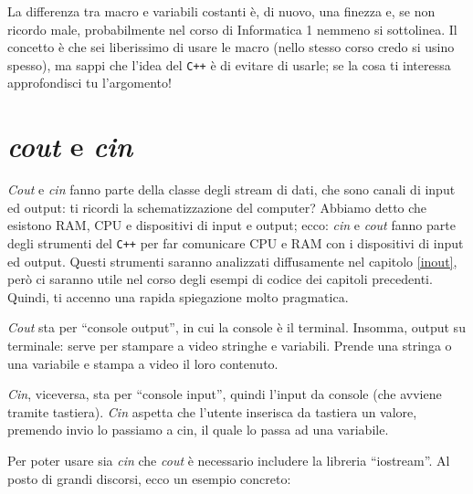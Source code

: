 	La differenza tra macro e variabili costanti è, di nuovo, una finezza e, se non ricordo male, probabilmente nel corso di Informatica 1 nemmeno si sottolinea. Il concetto è che sei liberissimo di usare le macro (nello stesso corso credo si usino spesso), ma sappi che l'idea del \verb|C++| è di evitare di usarle; se la cosa ti interessa approfondisci tu l'argomento!
	
	\section{\emph{cout} e \emph{cin}}\label{coutcin}
	\emph{Cout} e \emph{cin} fanno parte della classe degli stream di dati, che sono canali di input ed output: ti ricordi la schematizzazione del computer? Abbiamo detto che esistono RAM, CPU e dispositivi di input e output; ecco: \emph{cin} e \emph{cout} fanno parte degli strumenti del \verb|C++| per far comunicare CPU e RAM con i dispositivi di input ed output. Questi strumenti saranno analizzati diffusamente nel capitolo \ref{inout}, però ci saranno utile nel corso degli esempi di codice dei capitoli precedenti. Quindi, ti accenno una rapida spiegazione molto pragmatica.
	
	
	\emph{Cout} sta per ``console output'',  in cui la console è il terminal. Insomma, output su terminale: serve per stampare a video stringhe e variabili. Prende una stringa o una variabile e stampa a video il loro contenuto.
	
	\emph{Cin}, viceversa, sta per ``console input'', quindi l'input da console (che avviene tramite tastiera). \emph{Cin} aspetta che l'utente inserisca da tastiera un valore, premendo invio lo passiamo a cin, il quale lo passa ad una variabile.
	
	Per poter usare sia \emph{cin} che \emph{cout} è necessario includere la libreria ``iostream''.
	Al posto di grandi discorsi, ecco un esempio concreto:
	
	
